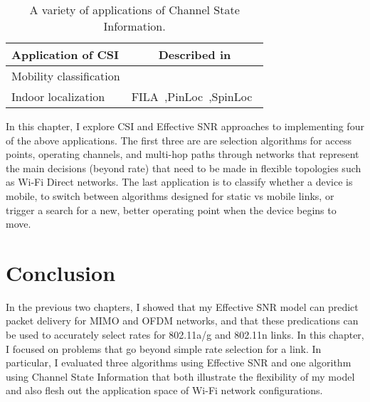 \begin{table}[htp]
	\centering
	\begin{tabular}{lc}
	\toprule
		\textbf{Application of CSI} & \textbf{Described in} \\
	\midrule
		Mobility classification & \secref{sec:esnr_mobility}\\
		Indoor localization & FILA~\cite{Wu_FILA},PinLoc~\cite{Sen_PinLoc},SpinLoc~\cite{Sen_SpinLoc} \\ 
	\bottomrule
	\end{tabular}
	\caption[A variety of applications of Channel State Information]{\label{tab:csi_uses}A variety of applications of Channel State Information.}
\end{table}

In this chapter, I explore CSI and Effective SNR approaches to implementing four of the above applications. The first three are are selection algorithms for access points, operating channels, and multi-hop paths through networks that represent the main decisions (beyond rate) that need to be made in flexible topologies such as Wi-Fi Direct networks. The last application is to classify whether a device is mobile, to switch between algorithms designed for static vs mobile links, or trigger a search for a new, better operating point when the device begins to move.






\section{Conclusion}
In the previous two chapters, I showed that my Effective SNR model can predict packet delivery for MIMO and OFDM networks, and that these predications can be used to accurately select rates for 802.11a/g and 802.11n links. In this chapter, I focused on problems that go beyond simple rate selection for a link. In particular, I evaluated three algorithms using Effective SNR and one algorithm using Channel State Information that both illustrate the flexibility of my model and also flesh out the application space of Wi-Fi network configurations.


